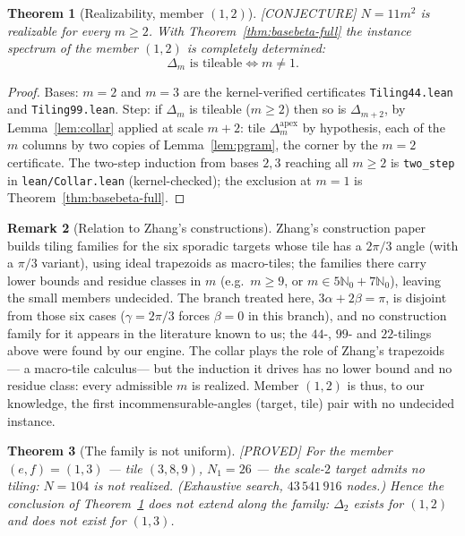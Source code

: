\documentclass[11pt,reqno]{amsart}
\theoremstyle{plain}
\newtheorem{theorem}{Theorem}
\theoremstyle{definition}
\newtheorem{remark}[theorem]{Remark}
\newcommand{\N}{\mathbb{N}}
\newcommand{\lab}[1]{\hfill\textnormal{\footnotesize\textsc{[#1]}}}
\begin{document}
\begin{theorem}[Realizability, member $(1,2)$]\label{thm:realize12}\lab{CONJECTURE}
$N=11m^2$ is realizable for every $m\ge 2$. With Theorem~\ref{thm:basebeta-full} the instance
spectrum of the member $(1,2)$ is completely determined:
\[
\Delta_m \text{ is tileable} \iff m\neq 1.
\]
\end{theorem}

\begin{proof}
Bases: $m=2$ and $m=3$ are the kernel-verified certificates \textup{\texttt{Tiling44.lean}} and
\textup{\texttt{Tiling99.lean}}. Step: if $\Delta_m$ is tileable ($m\ge2$) then so is
$\Delta_{m+2}$, by Lemma~\ref{lem:collar} applied at scale $m+2$: tile
$\Delta_{m}^{\mathrm{apex}}$ by hypothesis, each of the $m$ columns by two copies of
Lemma~\ref{lem:pgram}, the corner by the $m=2$ certificate. The two-step induction from bases
$2,3$ reaching all $m\ge2$ is \texttt{two\_step} in \textup{\texttt{lean/Collar.lean}}
(kernel-checked); the exclusion at $m=1$ is Theorem~\ref{thm:basebeta-full}.
\end{proof}

\begin{remark}[Relation to Zhang's constructions]\label{rem:zhangcompare}
Zhang's construction paper~\cite{Zhang} builds tiling families for the six sporadic targets whose
tile has a $2\pi/3$ angle (with a $\pi/3$ variant), using ideal trapezoids as macro-tiles; the
families there carry lower bounds and residue classes in $m$ (e.g.\ $m\ge9$, or
$m\in5\N_0+7\N_0$), leaving the small members undecided. The branch treated here,
$3\alpha+2\beta=\pi$, is disjoint from those six cases ($\gamma=2\pi/3$ forces $\beta=0$ in this
branch), and no construction family for it appears in the literature known to us; the $44$-, $99$-
and $22$-tilings above were found by our engine. The collar plays the role of Zhang's trapezoids
--- a macro-tile calculus--- but the induction it drives has no lower bound and no residue
class: every admissible $m$ is realized. Member $(1,2)$ is thus, to our knowledge, the first
incommensurable-angles (target, tile) pair with no undecided instance.
\end{remark}

\begin{theorem}[The family is not uniform]\label{thm:notuniform}\lab{PROVED}
For the member $(e,f)=(1,3)$ --- tile $(3,8,9)$, $N_1=26$ --- the scale-$2$ target admits no tiling:
$N=104$ is not realized. \textup{(Exhaustive search, $43\,541\,916$ nodes.)} Hence the conclusion of
Theorem~\ref{thm:realize12} does not extend along the family: $\Delta_2$ exists for $(1,2)$ and does
not exist for $(1,3)$.
\end{theorem}
\end{document}
